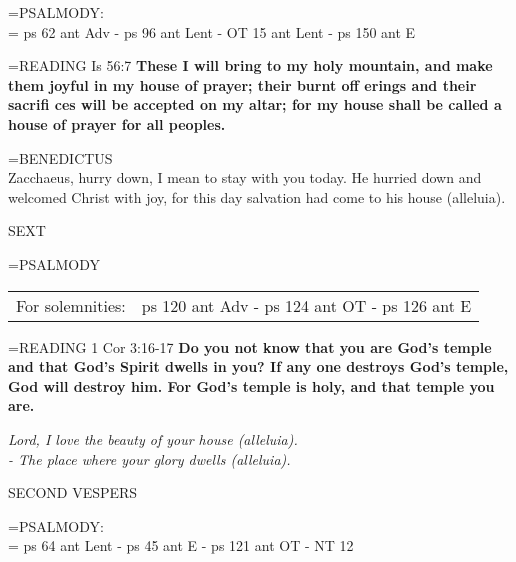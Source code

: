 \hangindent=\parindent \small{PSALMODY:}\\
\hangindent=\parindent  \vspace{0.5em}
ps 62 ant Adv - ps 96 ant Lent - OT 15 ant Lent - ps 150 ant E

\hangindent=\parindent \small{READING} Is 56:7 \textbf{These I will bring to my holy mountain, and make them joyful in my house of prayer; their burnt off erings and their sacrifi ces will be accepted on my altar; for my house shall be called a house of prayer for all peoples.\\}

\hangindent=\parindent \small{BENEDICTUS \\}
Zacchaeus, hurry down, I mean to stay with you today.  He hurried down and welcomed Christ with joy, for this day salvation had come to his house (alleluia).

\begin{flushleft}\normalsize SEXT\\\end{flushleft}

\hangindent=\parindent \small{PSALMODY}
\begin{center}
\begin{tabular}{ l l }
For solemnities: &  ps 120 ant Adv - ps 124 ant OT - ps 126 ant E\\
\end{tabular}
\end{center}		

\hangindent=\parindent \small{READING} 1 Cor 3:16-17 \textbf{Do you not know that you are God’s temple and that God’s Spirit dwells in you? If any one destroys God’s temple, God will destroy him. For God’s temple is holy, and that temple you are.}

\begin{center}
\textit{Lord, I love the beauty of your house (alleluia).\\
- The place where your glory dwells (alleluia).}
\end{center}

\begin{flushleft}\normalsize SECOND VESPERS\\\end{flushleft}

\hangindent=\parindent \small{PSALMODY:}\\
\hangindent=\parindent \vspace{0.5em}
ps 64 ant Lent - ps 45 ant E - ps 121 ant OT - NT 12

